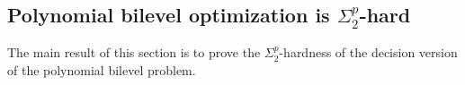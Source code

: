 \documentclass{article}
\newcommand*{\cY}{\mathcal{Y}}
\newcommand*{\RR}{\mathbb{R}}
\newcommand{\argmin}{\arg\min}
\newcommand{\firstvar}{x}
\newcommand{\secondvar}{y}
\newcommand{\ff}{\varphi}
\newcommand{\existleveltwo}{\Sigma_2^p}
\newcommand{\TL}[1]{\textcolor{red}{#1}}
\theoremstyle{plain}
\newtheorem{theorem}{Theorem}[section]
\newtheorem{lemma}[theorem]{Lemma}
\theoremstyle{definition}
\begin{document}
\subsection{Polynomial bilevel optimization is $\existleveltwo$-hard}

The main result of this section is to prove the $\existleveltwo$-hardness of the decision version of the polynomial bilevel problem.
\end{document}
